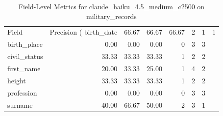 \begin{table}
\caption{Field-Level Metrics for claude_haiku_4.5_medium_c2500 on military_records}
\label{tab:fields_claude_haiku_4.5_medium_c2500_military_records}
\begin{tabular}{lrrrrrr}
\toprule
Field & Precision (%
\midrule
birth_date & 66.67 & 66.67 & 66.67 & 2 & 1 & 1 \\
birth_place & 0.00 & 0.00 & 0.00 & 0 & 3 & 3 \\
civil_status & 33.33 & 33.33 & 33.33 & 1 & 2 & 2 \\
first_name & 20.00 & 33.33 & 25.00 & 1 & 4 & 2 \\
height & 33.33 & 33.33 & 33.33 & 1 & 2 & 2 \\
profession & 0.00 & 0.00 & 0.00 & 0 & 3 & 3 \\
surname & 40.00 & 66.67 & 50.00 & 2 & 3 & 1 \\
\bottomrule
\end{tabular}
\end{table}
